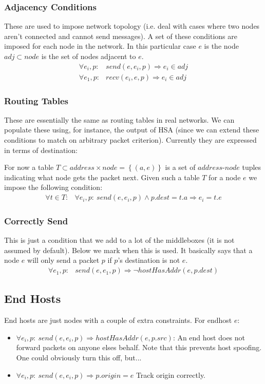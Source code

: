 \subsubsection{Adjacency Conditions}
These are used to impose network topology (i.e. deal with cases where two nodes aren't connected and cannot send
messages). A set of these conditions are imposed for each node in the network.
In this particular case $e$ is the node $adj \subset node$ is the set of nodes adjacent to $e$.
\begin{align*}
\forall e_i, p:& send(e, e_i, p) \Rightarrow e_i \in adj\\
\forall e_1, p:& recv(e_i, e, p) \Rightarrow e_i \in adj
\end{align*}

\subsubsection{Routing Tables}
These are essentially the same as routing tables in real networks. We can populate these using, for instance, the output
of HSA (since we can extend these conditions to match on arbitrary packet criterion). Currently they are expressed in
terms of destination:

For now a table $T \subset address\times node = \left\{ (a, e) \right\}$ is a set of $address$-$node$ tuples indicating what node gets the packet
next. Given such a table $T$ for a node $e$ we impose the following condition:
\begin{align*}
\forall t\in T:& \forall e_i, p:\ send(e, e_i, p) \land p.dest = t.a \Rightarrow e_i = t.e
\end{align*}

\subsubsection{Correctly Send}
This is just a condition that we add to a lot of the middleboxes (it is not assumed by default). Below we mark when this
is used. It basically says that a node $e$ will only send a packet $p$ if $p$'s destination is not $e$.
\begin{align}\label{eq:sanesend}
\forall e_1, p:& send(e, e_1, p) \Rightarrow \neg hostHasAddr(e, p.dest)
\end{align}

\subsection{End Hosts}
End hosts are just nodes with a couple of extra constraints. For endhost $e$:
\begin{itemize}
\item $\forall e_i, p:\ send(e, e_i, p) \Rightarrow hostHasAddr(e, p.src)$: An end host does not forward packets on anyone
elses behalf. Note that this prevents host spoofing. One could obviously turn this off, but...
\item $\forall e_i, p:\ send(e, e_i, p) \Rightarrow p.origin = e$ Track origin correctly.
\end{itemize}

